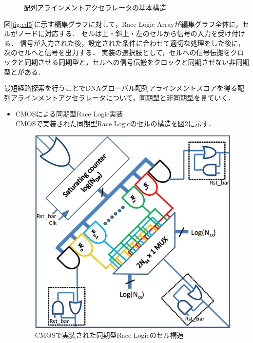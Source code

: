 \begin{figure}[t!]
\begin{center}
\caption{配列アラインメントアクセラレータの基本構造}
\label{fig:racelogicarray}
\end{center}
\end{figure}
図\ref{fig:ed5}に示す編集グラフに対して，Race Logic Arrayが編集グラフ全体に，セルがノードに対応する．
セルは上・斜上・左のセルから信号の入力を受け付ける．
信号が入力された後，設定された条件に合わせて適切な処理をした後に，
次のセルへと信号を出力する．
実装の選択肢として，セルへの信号伝搬をクロックと同期させる同期型と，セルへの信号伝搬をクロックと同期させない非同期型とがある．

最短経路探索を行うことでDNAグローバル配列アラインメントスコアを得る配列アラインメントアクセラレータについて，同期型と非同期型を見ていく．

\begin{itemize}
\item CMOSによる同期型Race Logic実装\\
CMOSで実装された同期型Race Logicのセルの構造を図\ref{fig:CMOSsync}に示す．
\begin{figure}[t!]
\begin{center}
\includegraphics[keepaspectratio,scale=0.2]{fig/2/CMOSsync.png}
\caption{CMOSで実装された同期型Race Logicのセル構造\cite{madhavan2014race}}
\label{fig:CMOSsync}
\end{center}
\end{figure}


\end{itemize}
